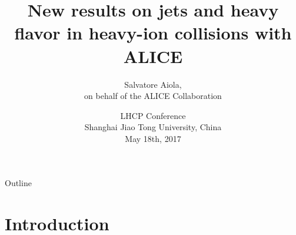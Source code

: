 \documentclass[xcolor={usenames,dvipsnames}]{beamer}
\title[Jets and heavy flavor in heavy-ion collisions with ALICE] %
{New results on jets and heavy flavor in heavy-ion collisions with ALICE}
\author[Salvatore Aiola (Yale University)]%
{Salvatore Aiola, \\
on behalf of the ALICE Collaboration}
\institute[Yale University] %
{Yale University}
\date[May 18th, 2017] %
{LHCP Conference \\
Shanghai Jiao Tong University, China\\
May 18th, 2017}
\begin{document}
\begin{frame}
  \titlepage
\end{frame}

\begin{frame}{Outline}
   \tableofcontents
\end{frame}








\section{Introduction}
\end{document}

